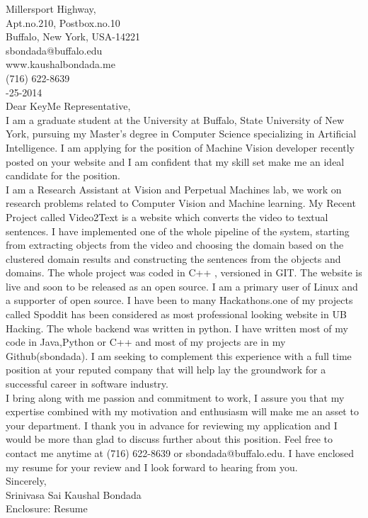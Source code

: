 \documentclass[10pt,letterpaper,oneside]{article}
\begin{document}
 Millersport Highway,\\
Apt.no.210, Postbox.no.10\\
Buffalo, New York, USA-14221\\
sbondada@buffalo.edu\\
www.kaushalbondada.me\\
(716) 622-8639\\

-25-2014\\
 
\noindent Dear KeyMe Representative,\\
 
I am a graduate student at the University at Buffalo, State University of New York, pursuing my Master's degree in Computer Science specializing in Artificial Intelligence. I am applying
for the position of Machine Vision developer recently posted on your website and I am confident that my skill set make me an ideal candidate for the position.\\

I am a Research Assistant at Vision and Perpetual Machines lab, we work on research problems related to Computer Vision and Machine learning. My Recent Project called Video2Text is a website which converts the video to textual sentences. I have implemented one of the whole pipeline of the system, starting from extracting objects from the video and choosing  the domain based on the
clustered domain results and constructing the sentences from the objects and domains. The whole project was coded in C++
, versioned in GIT. The website is live and soon to be released
as an open source. I am a primary user of Linux and a supporter of open source. I have been to many Hackathons.one of my projects called
Spoddit has been considered as most professional looking website in UB Hacking. The whole backend was written in python. I have written most of my code in
Java,Python or C++ and most of my projects are in my Github(sbondada). I am seeking to complement this experience with a full time position at your reputed company that will help lay the groundwork for a successful career in software industry.\\

I bring along with me passion and commitment to work, I assure you that my expertise combined with my motivation
and enthusiasm will make me an asset to your department. I thank you in advance for reviewing my application and I would be more than glad to
discuss further about this position. Feel free to contact me anytime at (716) 622-8639 or sbondada@buffalo.edu. I have enclosed my resume for your review and I look forward to hearing from you.\\
 
\noindent Sincerely,\\
Srinivasa Sai Kaushal Bondada\\
Enclosure: Resume\\
\end{document}

